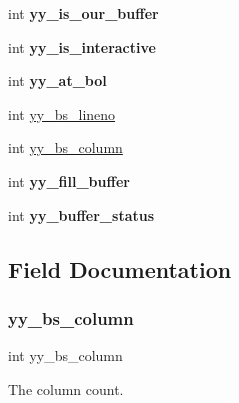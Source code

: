 \begin{DoxyCompactItemize}
\mbox{\label{structyy__buffer__state_a1e64bbdc1343d886bee3af97e19644bc}} 
int {\bfseries yy\+\_\+is\+\_\+our\+\_\+buffer}
\item 
\mbox{\label{structyy__buffer__state_a2a823a361fbbe1af51a957d0d0cbf4e2}} 
int {\bfseries yy\+\_\+is\+\_\+interactive}
\item 
\mbox{\label{structyy__buffer__state_a8e60af6806593faf52d1cc01148af6e3}} 
int {\bfseries yy\+\_\+at\+\_\+bol}
\item 
int \hyperlink{structyy__buffer__state_a59c414c619ca0071fe3a091336106d82}{yy\+\_\+bs\+\_\+lineno}
\item 
int \hyperlink{structyy__buffer__state_ad9867983bbc1666304d83623cd6e3dd8}{yy\+\_\+bs\+\_\+column}
\item 
\mbox{\label{structyy__buffer__state_a5e492694db97a0d7760d8cc5fd058dfd}} 
int {\bfseries yy\+\_\+fill\+\_\+buffer}
\item 
\mbox{\label{structyy__buffer__state_a6ca09e676a787676260c558a0f731285}} 
int {\bfseries yy\+\_\+buffer\+\_\+status}
\end{DoxyCompactItemize}


\subsection{Field Documentation}
\mbox{\label{structyy__buffer__state_ad9867983bbc1666304d83623cd6e3dd8}} 
\subsubsection{\texorpdfstring{yy\+\_\+bs\+\_\+column}{yy\_bs\_column}}
{\footnotesize\ttfamily int yy\+\_\+bs\+\_\+column}

The column count. \mbox{\label{structyy__buffer__state_a59c414c619ca0071fe3a091336106d82}} 
